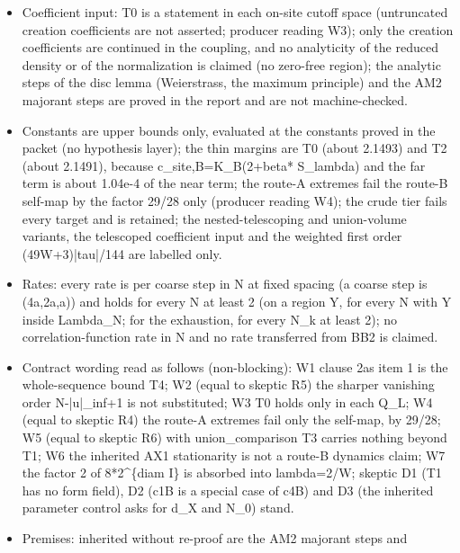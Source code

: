 \begin{gatequote}
\begin{itemize}
other node and no convergence of finite-box nodes C\_N(1) to C\_inf(1) is
claimed, and the -tau value is the U\_E mirror replay; the labelled own
re-evaluations of the radius (the producer\textquotesingle{}s and the
skeptic\textquotesingle{}s, each about 2.7e-41 below R\textquotesingle{}) are
cross-checks, not the headline.
\item Coefficient input: T0 is a statement in each on-site cutoff space
(untruncated creation coefficients are not asserted; producer reading W3);
only the creation coefficients are continued in the coupling, and no
analyticity of the reduced density or of the normalization is claimed (no
zero-free region); the analytic steps of the disc lemma (Weierstrass, the
maximum principle) and the AM2 majorant steps are proved in the report and are
not machine-checked.
\item Constants are upper bounds only, evaluated at the constants proved in
the packet (no hypothesis layer); the thin margins are T0 (about 2.1493) and
T2 (about 2.1491), because c\_site,B=K\_B(2+beta* S\_lambda) and the far term
is about 1.04e-4 of the near term; the route-A extremes fail the route-B
self-map by the factor 29/28 only (producer reading W4); the crude tier fails
every target and is retained; the nested-telescoping and union-volume
variants, the telescoped coefficient input and the weighted first order
(49W+3)|tau|/144 are labelled only.
\item Rates: every rate is per coarse step in N at fixed spacing (a coarse
step is (4a,2a,a)) and holds for every N at least 2 (on a region Y, for every
N with Y inside Lambda\_N; for the exhaustion, for every N\_k at least 2); no
correlation-function rate in N and no rate transferred from BB2 is claimed.
\item Contract wording read as follows (non-blocking): W1 clause
2a\textquotesingle{}s item 1 is the whole-sequence bound T4; W2 (equal to
skeptic R5) the sharper vanishing order N-|u|\_inf+1 is not substituted; W3 T0
holds only in each Q\_L; W4 (equal to skeptic R4) the route-A extremes fail
only the self-map, by 29/28; W5 (equal to skeptic R6) with union\_comparison
T3 carries nothing beyond T1; W6 the inherited AX1 stationarity is not a
route-B dynamics claim; W7 the factor 2 of 8*2\textasciicircum{}\{diam I\} is
absorbed into lambda=2/W; skeptic D1 (T1 has no form field), D2 (c1B is a
special case of c4B) and D3 (the inherited parameter control asks for d\_X and
N\_0) stand.
\item Premises: inherited without re-proof are the AM2 majorant steps and

\end{itemize}
\end{gatequote}
